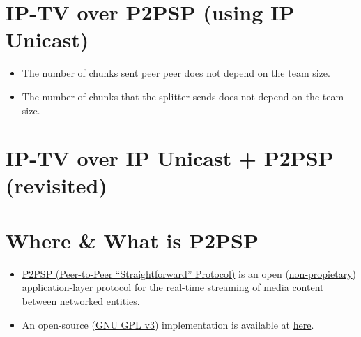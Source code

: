 \documentclass{article}
\begin{document}
\ifx \HCode\Undfef
\else
{}
\fi


\section{IP-TV over P2PSP (using IP Unicast)}

\ifx \HCode\Undfef
\else
{}
\fi

\begin{itemize}
\item The number of chunks sent peer peer does not depend on the team
  size.
\item The number of chunks that the splitter sends does not depend on
  the team size.
\end{itemize}


\section{IP-TV over IP Unicast + P2PSP (revisited)}

\ifx \HCode\Undfef
\else
{}
\fi


\section{Where \& What is P2PSP}

\begin{itemize}

\item \href{http://www.p2psp.org/en/}{P2PSP (Peer-to-Peer ``Straightforward'' Protocol)} is an open
  (\href{http://www.oxforddictionaries.com/definition/english/non-proprietary}{non-propietary})
  application-layer protocol for the real-time streaming of media
  content between networked entities.
\item An open-source (\href{https://www.gnu.org/copyleft/gpl.html}{GNU
    GPL v3}) implementation is available at
  \href{https://launchpad.net/p2psp}{here}.
\end{itemize}
\end{document}
